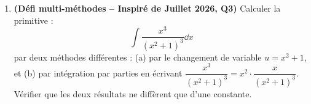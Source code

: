 \begin{enumerate}[label=\textbf{Exercice 6.\arabic* --}]
    \item \textbf{(Défi multi-méthodes -- Inspiré de Juillet 2026, Q3)} Calculer la primitive :
    \[
        \int \frac{x^3}{(x^2 + 1)^3}\dd x
    \]
    par deux méthodes différentes : (a) par le changement de variable $u = x^2 + 1$, et (b) par intégration par parties en écrivant $\dfrac{x^3}{(x^2+1)^3} = x^2 \cdot \dfrac{x}{(x^2+1)^3}$. Vérifier que les deux résultats ne diffèrent que d'une constante.
\end{enumerate}
